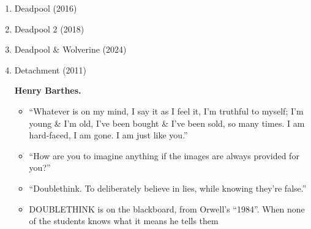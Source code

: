 \documentclass{article}
\begin{document}
\begin{enumerate}
\begin{itemize}
		\item ``No matter what anybody tells you, words \& ideas can change the world.'' -- Tom Schulman, Dead Poets Society
		\item ``When you read, don't just consider what the author thinks, consider what you think.'' --  Tom Schulman, Dead Poets Society: The Screenplay
		\item ``If you listen real close, you can hear them whisper their legacy to you. Go on, lean in. Listen, you hear it? -- Carpe -- hear it? -- Carpe, Carpe Diem, seize the day boys, make you lives extraordinary.'' -- N.H. Kleinbaum, Dead Poets Society
		\item ``Only in their dreams can men be truly free. `Twas always thus, \& always thus will be.'' -- Tom Schulman, Dead Poets Society
		\item ``I close my eyes, \& this image floats beside me.

		A sweaty toothed mad man with a stare that pounds my brain.

		His hands reach out \& choke me, \& all the time he's mumbling.

		``Truth, truth.''

		Like a blanket that always leaves your feet cold.

		You push it, stretch it, but it'll never be enough.

		You kick at it, beat it, it'll never cover any of us.

		From the moment we enter crying,

		to the moment we leave dying,

		it'll just cover your face,

		as you wail \& cry \& scream.'' -- Tom Schulman, Dead Poets Society
		\item ``Sucking the marrow out of life doesn't choking on the bone.'' -- Tom Schulman, Dead Poets Society
	\end{itemize}
	\item {\sc Deadpool} (2016)
	\item {\sc Deadpool 2} (2018)
	\item {\sc Deadpool \& Wolverine} (2024)
	\item Detachment (2011)

	{\bf Henry Barthes.}
	\begin{itemize}
		\item ``Whatever is on my mind, I say it as I feel it, I'm truthful to myself; I'm young \& I'm old, I've been bought \& I've been sold, so many times. I am hard-faced, I am gone. I am just like you.''
		\item ``How are you to imagine anything if the images are always provided for you?''
		\item ``Doublethink. To deliberately believe in lies, while knowing they're false.''
		\item DOUBLETHINK is on the blackboard, from Orwell's ``1984''. When none of the students knows what it means he tells them


\end{itemize}
\end{enumerate}
\end{document}
